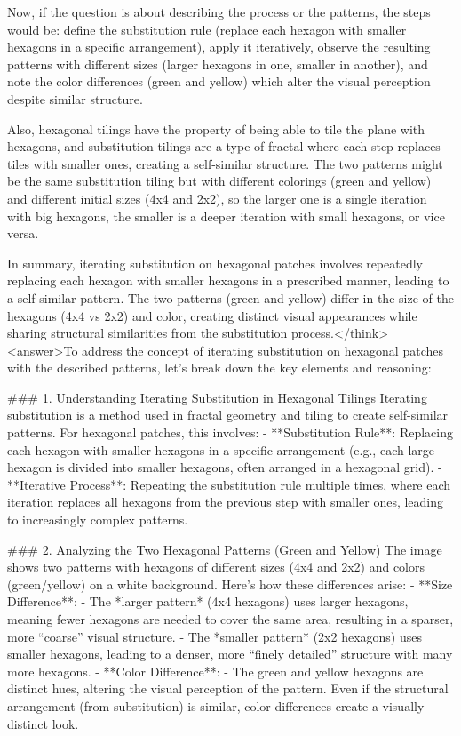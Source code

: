 Now, if the question is about describing the process or the patterns, the steps would be: define the substitution rule (replace each hexagon with smaller hexagons in a specific arrangement), apply it iteratively, observe the resulting patterns with different sizes (larger hexagons in one, smaller in another), and note the color differences (green and yellow) which alter the visual perception despite similar structure.

Also, hexagonal tilings have the property of being able to tile the plane with hexagons, and substitution tilings are a type of fractal where each step replaces tiles with smaller ones, creating a self-similar structure. The two patterns might be the same substitution tiling but with different colorings (green and yellow) and different initial sizes (4x4 and 2x2), so the larger one is a single iteration with big hexagons, the smaller is a deeper iteration with small hexagons, or vice versa.

In summary, iterating substitution on hexagonal patches involves repeatedly replacing each hexagon with smaller hexagons in a prescribed manner, leading to a self-similar pattern. The two patterns (green and yellow) differ in the size of the hexagons (4x4 vs 2x2) and color, creating distinct visual appearances while sharing structural similarities from the substitution process.</think><answer>To address the concept of iterating substitution on hexagonal patches with the described patterns, let’s break down the key elements and reasoning:  


### 1. Understanding Iterating Substitution in Hexagonal Tilings  
Iterating substitution is a method used in fractal geometry and tiling to create self-similar patterns. For hexagonal patches, this involves:  
- **Substitution Rule**: Replacing each hexagon with smaller hexagons in a specific arrangement (e.g., each large hexagon is divided into smaller hexagons, often arranged in a hexagonal grid).  
- **Iterative Process**: Repeating the substitution rule multiple times, where each iteration replaces all hexagons from the previous step with smaller ones, leading to increasingly complex patterns.    

### 2. Analyzing the Two Hexagonal Patterns (Green and Yellow)  
The image shows two patterns with hexagons of different sizes (4x4 and 2x2) and colors (green/yellow) on a white background. Here’s how these differences arise:  
- **Size Difference**:  
  - The *larger pattern* (4x4 hexagons) uses larger hexagons, meaning fewer hexagons are needed to cover the same area, resulting in a sparser, more “coarse” visual structure.  
  - The *smaller pattern* (2x2 hexagons) uses smaller hexagons, leading to a denser, more “finely detailed” structure with many more hexagons.  
- **Color Difference**:  
  - The green and yellow hexagons are distinct hues, altering the visual perception of the pattern. Even if the structural arrangement (from substitution) is similar, color differences create a visually distinct look.    

